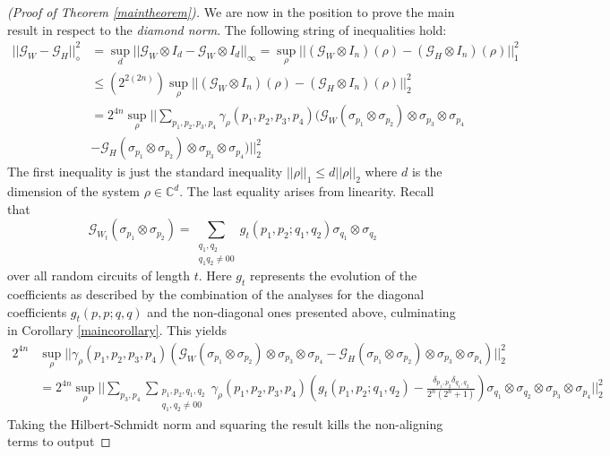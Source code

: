 \documentclass[12pt]{amsart}
\theoremstyle{definition}
\theoremstyle{remark}
\numberwithin{equation}{section}
\theoremstyle{remark}
\begin{document}
\begin{proof}[(Proof of Theorem \ref{maintheorem})]
  We are now in the position to prove the main result in respect to the \emph{diamond norm}. The following string of inequalities hold:
  \begin{align}
    ||\mathcal{G}_W - \mathcal{G}_H ||_{\diamond}^2
    & = \sup_d|| \mathcal{G}_W \otimes I_d - \mathcal{G}_W \otimes I_d||_{\infty} = \sup_{\rho} ||(\mathcal{G}_W \otimes I_n)(\rho) - (\mathcal{G}_H \otimes I_n)(\rho) ||_1^2 \\
    & \leq (2^{2(2n)})\sup_{\rho} ||(\mathcal{G}_W \otimes I_n)(\rho) - (\mathcal{G}_H \otimes I_n)(\rho) ||_2^2\\
    & = 2^{4n} \sup_{\rho} ||\sum_{p_1,p_2,p_3,p_4}\gamma_{\rho}(p_1,p_2,p_3,p_4) ( \mathcal{G}_W(\sigma_{p_1} \otimes \sigma_{p_2}) \otimes \sigma_{p_3} \otimes \sigma_{p_4} \\
    & - \mathcal{G}_H(\sigma_{p_1} \otimes \sigma_{p_2}) \otimes \sigma_{p_3} \otimes \sigma_{p_4} ) ||_2^2
  \end{align}
  The first inequality is just the standard inequality $||\rho||_1 \leq d ||\rho||_2$ where $d$ is the dimension of the system $\rho \in \mathbb{C}^{d}$. The last equality arises from linearity. Recall that
  $$ \mathcal{G}_{W_t}(\sigma_{p_1}\otimes \sigma_{p_2}) = \sum_{\substack{q_1,q_2 \\ q_1q_2 \neq 00}} g_t(p_1,p_2 ; q_1,q_2) \sigma_{q_1} \otimes \sigma_{q_2} $$
  over all random circuits of length $t$. Here $g_t$ represents the evolution of the coefficients as described by the combination of the analyses for the diagonal coefficients $g_t(p,p;q,q)$ and the non-diagonal ones presented above, culminating in Corollary \ref{maincorollary}. This yields
  \begin{align*}
     2^{4n} & \sup_{\rho} ||\gamma_{\rho}(p_1,p_2,p_3,p_4) \left( \mathcal{G}_W(\sigma_{p_1} \otimes \sigma_{p_2}) \otimes \sigma_{p_3} \otimes \sigma_{p_4} - \mathcal{G}_H(\sigma_{p_1} \otimes \sigma_{p_2}) \otimes \sigma_{p_3} \otimes \sigma_{p_4} \right) ||_2^2  \\
     & = 2^{4n} \sup_{\rho} || \sum_{p_3,p_4} \sum_{\substack{p_1,p_2,q_1,q_2 \\ q_1,q_2 \neq 00}}\gamma_{\rho}(p_1,p_2,p_3,p_4) \left( g_t(p_1,p_2;q_1,q_2) - \frac{\delta_{p_1,p_2}\delta_{q_1,q_2}}{2^n(2^n+1)} \right) \sigma_{q_1} \otimes \sigma_{q_2} \otimes \sigma_{p_3} \otimes \sigma_{p_4}   ||^2_2
  \end{align*}
  Taking the Hilbert-Schmidt norm and squaring the result kills the non-aligning terms to output

\end{proof}
\end{document}
